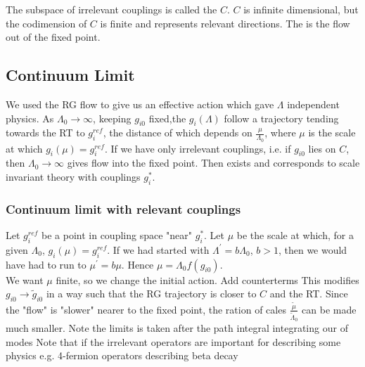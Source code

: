 \documentclass{article}
\begin{document}
The subspace of irrelevant couplings is called the  $C$. $C$ is infinite dimensional, but the codimension of $C$ is finite and represents relevant directions. The  is the flow out of the fixed point. 

\subsection{Continuum Limit}
We used the RG flow to give us an effective action 
which gave $\Lambda$ independent physics. As $\Lambda_0 \to \infty$, keeping $g_{i0}$ fixed,the $g_{i}(\Lambda)$ follow a trajectory tending towards the RT to $g_i^{ref}$, the distance of which depends on $\frac{\mu}{\Lambda_0}$, where $\mu$ is the scale at which $g_i(\mu) = g_i^{ref}$. If we have only irrelevant couplings, i.e. if $g_{i0}$ lies on $C$, then $\Lambda_0 \to \infty$ gives flow into the fixed point. Then 
exists and corresponds to scale invariant theory with couplings $g_i^\ast$. 

\subsubsection*{Continuum limit with relevant couplings}
Let $g_i^{ref}$ be a point in coupling space "near" $g_i^\ast$. Let $\mu$ be the scale at which, for a given $\Lambda_0$, $g_i(\mu) = g_i^{ref}$. If we had started with $\Lambda^\prime = b\Lambda_0$, $b > 1$, then we would have had to run to $\mu^\prime = b\mu$. Hence $\mu = \Lambda_0 f(g_{i0})$. \\
We want $\mu$ finite, so we change the initial action. Add counterterms
This modifies $g_{i0} \to \tilde{g}_{i0}$ in a way such that the RG trajectory is closer to $C$ and the RT. Since the "flow" is "slower" nearer to the fixed point, the ration of cales $\frac{\tilde{\mu}}{\tilde{\Lambda}_0}$ can be made much smaller. Note the limits is taken after the path integral integrating our of modes 
Note that if the irrelevant operators are important for describing some physics e.g. 4-fermion operators describing beta decay

\end{document}
